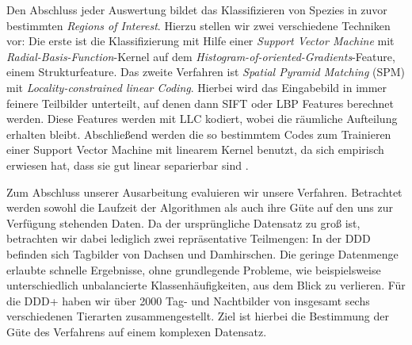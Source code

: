 Den Abschluss jeder Auswertung bildet das Klassifizieren von Spezies in zuvor bestimmten \emph{Regions of Interest}. Hierzu stellen wir zwei verschiedene Techniken vor:
Die erste ist die Klassifizierung mit Hilfe einer \emph{Support Vector Machine} mit \emph{Radial-Basis-Function}-Kernel auf dem \emph{Histogram-of-oriented-Gradients}-Feature, einem Strukturfeature. 
Das zweite Verfahren ist \emph{Spatial Pyramid Matching} (SPM) mit \emph{Locality-constrained linear Coding}. Hierbei wird das Eingabebild in immer feinere Teilbilder unterteilt, auf denen dann SIFT oder LBP Features berechnet werden. Diese Features werden mit LLC kodiert, wobei die räumliche Aufteilung erhalten bleibt. Abschließend werden die so bestimmtem Codes zum Trainieren einer Support Vector Machine mit linearem Kernel benutzt, da sich empirisch erwiesen hat, dass sie gut linear separierbar sind . 

Zum Abschluss unserer Ausarbeitung evaluieren wir unsere Verfahren. Betrachtet werden sowohl die Laufzeit der Algorithmen als auch ihre Güte auf den uns zur Verfügung stehenden Daten. Da der ursprüngliche Datensatz zu groß ist, betrachten wir dabei lediglich zwei repräsentative Teilmengen:
In der DDD befinden sich Tagbilder von Dachsen und Damhirschen. Die geringe Datenmenge erlaubte schnelle Ergebnisse, ohne grundlegende Probleme, wie beispielsweise unterschiedlich unbalancierte Klassenhäufigkeiten, aus dem Blick zu verlieren.
Für die DDD+ haben wir über 2000 Tag- und Nachtbilder von insgesamt sechs verschiedenen Tierarten zusammengestellt. Ziel ist hierbei die Bestimmung der Güte des Verfahrens auf einem komplexen Datensatz.
